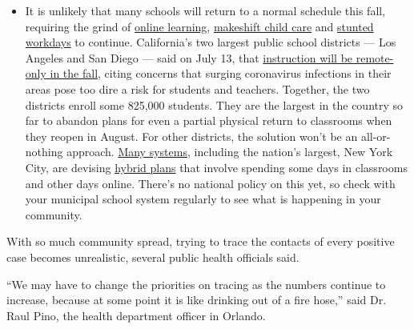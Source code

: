 \begin{itemize}
  \begin{itemize}
  \tightlist
  \item
    It is unlikely that many schools will return to a normal schedule
    this fall, requiring the grind of
    \href{https://www.nytimes3xbfgragh.onion/2020/06/05/us/coronavirus-education-lost-learning.html?action=click\&pgtype=Article\&state=default\&region=MAIN_CONTENT_3\&context=storylines_faq}{online
    learning},
    \href{https://www.nytimes3xbfgragh.onion/2020/05/29/us/coronavirus-child-care-centers.html?action=click\&pgtype=Article\&state=default\&region=MAIN_CONTENT_3\&context=storylines_faq}{makeshift
    child care} and
    \href{https://www.nytimes3xbfgragh.onion/2020/06/03/business/economy/coronavirus-working-women.html?action=click\&pgtype=Article\&state=default\&region=MAIN_CONTENT_3\&context=storylines_faq}{stunted
    workdays} to continue. California's two largest public school
    districts --- Los Angeles and San Diego --- said on July 13, that
    \href{https://www.nytimes3xbfgragh.onion/2020/07/13/us/lausd-san-diego-school-reopening.html?action=click\&pgtype=Article\&state=default\&region=MAIN_CONTENT_3\&context=storylines_faq}{instruction
    will be remote-only in the fall}, citing concerns that surging
    coronavirus infections in their areas pose too dire a risk for
    students and teachers. Together, the two districts enroll some
    825,000 students. They are the largest in the country so far to
    abandon plans for even a partial physical return to classrooms when
    they reopen in August. For other districts, the solution won't be an
    all-or-nothing approach.
    \href{https://bioethics.jhu.edu/research-and-outreach/projects/eschool-initiative/school-policy-tracker/}{Many
    systems}, including the nation's largest, New York City, are
    devising
    \href{https://www.nytimes3xbfgragh.onion/2020/06/26/us/coronavirus-schools-reopen-fall.html?action=click\&pgtype=Article\&state=default\&region=MAIN_CONTENT_3\&context=storylines_faq}{hybrid
    plans} that involve spending some days in classrooms and other days
    online. There's no national policy on this yet, so check with your
    municipal school system regularly to see what is happening in your
    community.
  \end{itemize}
\end{itemize}

With so much community spread, trying to trace the contacts of every
positive case becomes unrealistic, several public health officials said.

``We may have to change the priorities on tracing as the numbers
continue to increase, because at some point it is like drinking out of a
fire hose,'' said Dr. Raul Pino, the health department officer in
Orlando.


